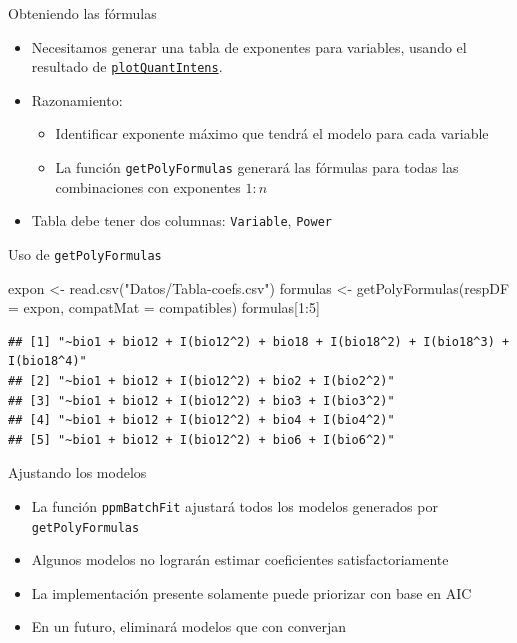 \documentclass[
  11pt,
  ignorenonframetext,
]{beamer}
\newenvironment{Shaded}{}{}
\newcommand{\AttributeTok}[1]{\textcolor[rgb]{0.49,0.56,0.16}{#1}}
\newcommand{\DecValTok}[1]{\textcolor[rgb]{0.25,0.63,0.44}{#1}}
\newcommand{\FunctionTok}[1]{\textcolor[rgb]{0.02,0.16,0.49}{#1}}
\newcommand{\NormalTok}[1]{#1}
\newcommand{\OtherTok}[1]{\textcolor[rgb]{0.00,0.44,0.13}{#1}}
\newcommand{\SpecialCharTok}[1]{\textcolor[rgb]{0.25,0.44,0.63}{#1}}
\newcommand{\StringTok}[1]{\textcolor[rgb]{0.25,0.44,0.63}{#1}}
\begin{document}
\begin{frame}[fragile]{Obteniendo las fórmulas}
\protect\hypertarget{obteniendo-las-fuxf3rmulas}{}
\begin{itemize}
\item
  Necesitamos generar una tabla de exponentes para variables, usando el
  resultado de
  \href{Respuestas-centroide.pdf}{\texttt{plotQuantIntens}}.
\item
  Razonamiento:

  \begin{itemize}
  \item
    Identificar exponente máximo que tendrá el modelo para cada variable
  \item
    La función \texttt{getPolyFormulas} generará las fórmulas para todas
    las combinaciones con exponentes \(1:n\)
  \end{itemize}
\item
  Tabla debe tener dos columnas: \texttt{Variable}, \texttt{Power}
\end{itemize}
\end{frame}

\begin{frame}[fragile]{Uso de \texttt{getPolyFormulas}}
\protect\hypertarget{uso-de-getpolyformulas}{}
\begin{Shaded}
\begin{Highlighting}[]
\NormalTok{expon }\OtherTok{\textless{}{-}} \FunctionTok{read.csv}\NormalTok{(}\StringTok{"Datos/Tabla{-}coefs.csv"}\NormalTok{)}
\NormalTok{formulas  }\OtherTok{\textless{}{-}} \FunctionTok{getPolyFormulas}\NormalTok{(}\AttributeTok{respDF =}\NormalTok{ expon, }
                             \AttributeTok{compatMat =}\NormalTok{ compatibles)}
\NormalTok{formulas[}\DecValTok{1}\SpecialCharTok{:}\DecValTok{5}\NormalTok{]}
\end{Highlighting}
\end{Shaded}

\begin{verbatim}
## [1] "~bio1 + bio12 + I(bio12^2) + bio18 + I(bio18^2) + I(bio18^3) + I(bio18^4)"
## [2] "~bio1 + bio12 + I(bio12^2) + bio2 + I(bio2^2)"                            
## [3] "~bio1 + bio12 + I(bio12^2) + bio3 + I(bio3^2)"                            
## [4] "~bio1 + bio12 + I(bio12^2) + bio4 + I(bio4^2)"                            
## [5] "~bio1 + bio12 + I(bio12^2) + bio6 + I(bio6^2)"
\end{verbatim}
\end{frame}

\begin{frame}[fragile]{Ajustando los modelos}
\protect\hypertarget{ajustando-los-modelos}{}
\begin{itemize}
\item
  La función \texttt{ppmBatchFit} ajustará todos los modelos generados
  por \texttt{getPolyFormulas}
\item
  Algunos modelos no lograrán estimar coeficientes satisfactoriamente
\item
  La implementación presente solamente puede priorizar con base en AIC
\item
  En un futuro, eliminará modelos que con converjan
\end{itemize}
\end{frame}
\end{document}
